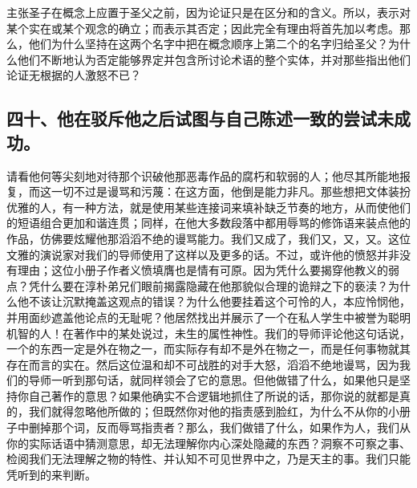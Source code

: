 主张圣子在概念上应置于圣父之前，因为论证只是在区分和的含义。所以，表示对某个实在或某个观念的确立；而表示其否定；因此完全有理由将首先加以考虑。那么，他们为什么坚持在这两个名字中把在概念顺序上第二个的名字归给圣父？为什么他们不断地认为否定能够界定并包含所讨论术语的整个实体，并对那些指出他们论证无根据的人激怒不已？\par


\subsection{四十、他在驳斥他之后试图与自己陈述一致的尝试未成功。}

请看他何等尖刻地对待那个识破他那恶毒作品的腐朽和软弱的人；他尽其所能地报复，而这一切不过是谩骂和污蔑：在这方面，他倒是能力非凡。那些想把文体装扮优雅的人，有一种方法，就是使用某些连接词来填补缺乏节奏的地方，从而使他们的短语组合更加和谐连贯；同样，在他大多数段落中都用辱骂的修饰语来装点他的作品，仿佛要炫耀他那滔滔不绝的谩骂能力。我们又成了，我们又，又，又。这位文雅的演说家对我们的导师使用了这样以及更多的话。不过，或许他的愤怒并非没有理由；这位小册子作者义愤填膺也是情有可原。因为凭什么要揭穿他教义的弱点？凭什么要在淳朴弟兄们眼前揭露隐藏在他那貌似合理的诡辩之下的亵渎？为什么他不该让沉默掩盖这观点的错误？为什么他要挂着这个可怜的人，本应怜悯他，并用面纱遮盖他论点的无耻呢？他居然找出并展示了一个在私人学生中被誉为聪明机智的人！在著作中的某处说过，未生的属性神性。我们的导师评论他这句话说，一个的东西一定是外在物之一，而实际存有却不是外在物之一，而是任何事物就其存在而言的实在。然后这位温和却不可战胜的对手大怒，滔滔不绝地谩骂，因为我们的导师一听到那句话，就同样领会了它的意思。但他做错了什么，如果他只是坚持你自己著作的意思？如果他确实不合逻辑地抓住了所说的话，那你说的就都是真的，我们就得忽略他所做的；但既然你对他的指责感到脸红，为什么不从你的小册子中删掉那个词，反而辱骂指责者？那么，我们做错了什么，如果作为人，我们从你的实际话语中猜测意思，却无法理解你内心深处隐藏的东西？洞察不可察之事、检阅我们无法理解之物的特性、并认知不可见世界中之，乃是天主的事。我们只能凭听到的来判断。\par


